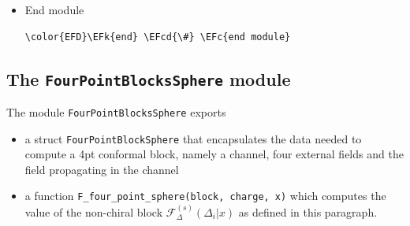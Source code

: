\documentclass[a4paper]{article}
\numberwithin{equation}{section}
\newcommand{\EFc}[1]{\textcolor{EFc}{#1}} %
\newcommand{\EFcd}[1]{\textcolor{EFcd}{#1}} %
\newcommand{\EFs}[1]{\textcolor{EFs}{#1}} %
\newcommand{\EFk}[1]{\textcolor{EFk}{#1}} %
\newcommand{\EFf}[1]{\textcolor{EFf}{#1}} %
\newcommand{\EFt}[1]{\textcolor{EFt}{#1}} %
\newcommand{\EFhn}[1]{\textcolor{EFhn}{#1}} %
\begin{document}
\begin{itemize}
\begin{Code}
\begin{Verbatim}
\EFs{"""}
\EFs{Compute `Rmn\char94{}torus`.}
\EFs{lr indicates the left or right moving parts of the fields}
\textcolor[HTML]{ff8e00}{\textbf{TODO:}} \EFs{value of regularisation}
\EFs{"""}
\EFk{function} \EFf{Rmn}(m, n, corr\EFt{::OnePointCorrelation}, lr)
    B = corr.charge[\EFs{"B"}]
    V = corr.field
    δ1 = V[\EFs{"δ"}][lr]
    \EFk{if} Rmn\_zero\_order(m, n, corr) \EFt{>} \EFhn{0}
        \EFk{return} \EFhn{0}
    \EFk{else}
        res = prod(prod(δrs(r, s, B) \EFt{-} δ1 \EFk{for} r in \EFhn{1}:\EFhn{2}:\EFhn{2}\EFt{*}m\EFt{-}\EFhn{1}) \EFk{for} s \EFk{in} \EFhn{1}\EFt{-}\EFhn{2}n:\EFhn{2}:\EFhn{2}n\EFt{-}\EFhn{1})
        \EFk{return} res\EFt{/}(\EFhn{2}\EFt{*}Dmn(m, n, B))
    \EFk{end}
\EFk{end}

\EFk{function} \EFf{computeCNmn}(N, m, n, corr\EFt{::OnePointCorrelation}, lr)
    B = corr.charge[\EFs{"B"}]
    \EFk{if} Rmn\_zero\_order(m, n, corr) \EFt{>} \EFhn{0}
        \EFk{return} \EFhn{0}
    \EFk{elseif} m\EFt{*}n \EFt{>} N
        \EFk{return} \EFhn{0}
    \EFk{elseif} m\EFt{*}n \EFt{==} N
        \EFk{return} Rmn(m, n, corr, lr)
    \EFk{else}
        res = sum(sum(computeCNmn(N\EFt{-}m\EFt{*}n, mp, np, corr, lr)\EFt{/}(δrs(m, \EFt{-}n, B)\EFt{-}δrs(mp, np, B))
                      \EFk{for} mp \EFk{in} \EFhn{1}:N\EFt{-}m\EFt{*}n \EFk{if} mp\EFt{*}np \EFt{<=} N\EFt{-}m\EFt{*}n)
                  \EFk{for} np \EFk{in} \EFhn{1}:N\EFt{-}m\EFt{*}n)
        \EFk{return} Rmn(m, n, corr, lr) \EFt{*} ((N\EFt{-}m\EFt{*}n\EFt{==}\EFhn{0})\EFt{+}res)
    \EFk{end}
\EFk{end}
\end{Verbatim}
\end{Code}
\item End module
\label{sec:orgf2e6869}

\begin{Code}
\begin{Verbatim}
\color{EFD}\EFk{end} \EFcd{\#} \EFc{end module}
\end{Verbatim}
\end{Code}
\end{itemize}
\subsection{The \texttt{FourPointBlocksSphere} module}
\label{sec:org9003e09}
The module \texttt{FourPointBlocksSphere} exports

\begin{itemize}
\item a struct \texttt{FourPointBlockSphere} that encapsulates the data needed to compute a 4pt conformal block, namely a channel, four external fields and the field propagating in the channel
\item a function \texttt{F\_four\_point\_sphere(block, charge, x)} which computes the value of the non-chiral block \(\mathcal F_{\Delta}^{(s)}(\Delta_i | x)\) as defined in this paragraph.
\end{itemize}
\end{document}
